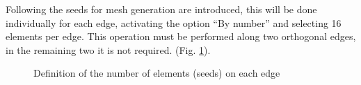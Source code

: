 \documentclass[english,a4paper,12pt]{article}
\begin{document}
Following the seeds for mesh generation are introduced, this will be done individually for each edge, activating the option ``By number'' and selecting 16 elements per edge. This operation must be performed along two orthogonal edges, in the remaining two it is not required.
(Fig. \ref{fig:seeds}).
\begin{figure}[h!tp]
\centering
{}
\caption{Definition of the number of elements (seeds) on each edge}
\label{fig:seeds}
\end{figure}
\end{document}
